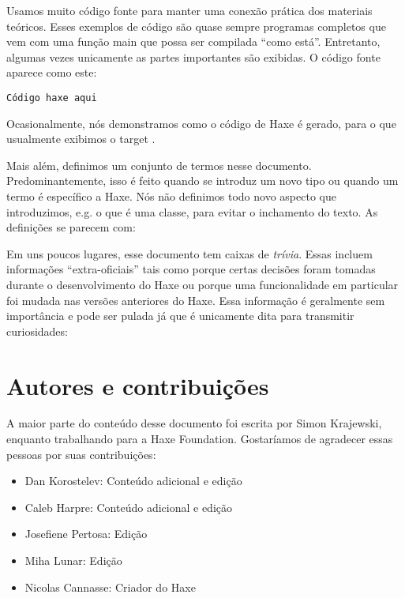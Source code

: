 Usamos muito código fonte para manter uma conexão prática dos materiais teóricos. Esses exemplos de código são quase sempre programas completos que vem com uma função main que possa ser compilada ``como está''. Entretanto, algumas vezes unicamente as partes importantes são exibidas.
O código fonte aparece como este:

\begin{lstlisting}
Código haxe aqui
\end{lstlisting}
Ocasionalmente, nós demonstramos como o código de Haxe é gerado, para o que usualmente exibimos o target .

Mais além, definimos um conjunto de termos nesse documento. Predominantemente, isso é feito quando se introduz um novo tipo ou quando um termo é específico a Haxe. Nós não definimos todo novo aspecto que introduzimos, e.g. o que é uma classe, para evitar o inchamento do texto. As definições se parecem com:


Em uns poucos lugares, esse documento tem caixas de \emph{trívia}. Essas incluem informações ``extra-oficiais'' tais como porque certas decisões foram tomadas durante o desenvolvimento do Haxe ou porque uma funcionalidade em particular foi mudada nas versões anteriores do Haxe. Essa informação é geralmente sem importância e pode ser pulada já que é unicamente dita para transmitir curiosidades:


\section{Autores e contribuições}
\label{introduction-authors-and-contributions}

A maior parte do conteúdo desse documento foi escrita por Simon Krajewski, enquanto trabalhando para a Haxe Foundation. Gostaríamos de agradecer essas pessoas por suas contribuições: 

\begin{itemize}
	\item Dan Korostelev: Conteúdo adicional e edição
	\item Caleb Harpre: Conteúdo adicional e edição
	\item Josefiene Pertosa: Edição
	\item Miha Lunar: Edição
	\item Nicolas Cannasse: Criador do Haxe
\end{itemize}

